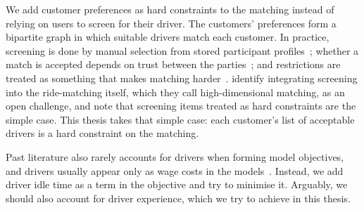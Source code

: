 We add customer preferences as hard constraints to the matching instead of relying on users to screen for their driver. The customers' preferences form a bipartite graph in which suitable drivers match each customer. In practice, screening is done by manual selection from stored participant profiles~\citep{furuhata2013ridesharing}; whether a match is accepted depends on trust between the parties~\citep{chaube2010trust}; and restrictions are treated as something that makes matching harder~\citep{agatz2012optimization}. \citet{furuhata2013ridesharing} identify integrating screening into the ride-matching itself, which they call high-dimensional matching, as an open challenge, and note that screening items treated as hard constraints are the simple case. This thesis takes that simple case: each customer's list of acceptable drivers is a hard constraint on the matching.

Past literature also rarely accounts for drivers when forming model objectives, and drivers usually appear only as wage costs in the models~\citep{cordeau2007dialaride}. Instead, we add driver idle time as a term in the objective and try to minimise it. Arguably, we should also account for driver experience, which we try to achieve in this thesis.